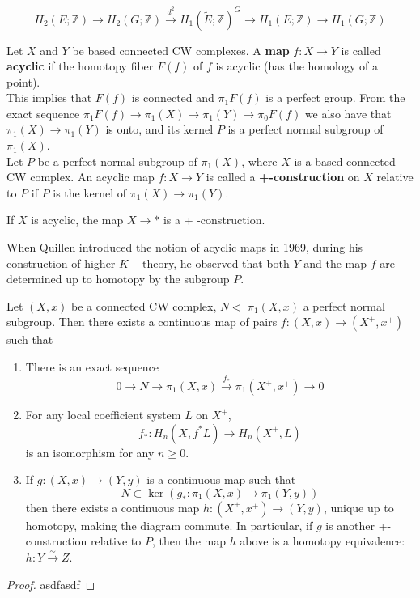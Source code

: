 $$
H_2(E ; \mathbb{Z}) \rightarrow H_2(G ; \mathbb{Z}) \xrightarrow{d^2} H_1(\tilde{E} ; \mathbb{Z})^G \rightarrow H_1(E ; \mathbb{Z}) \rightarrow H_1(G ; \mathbb{Z})
$$



Let $X$ and $Y$ be based connected CW complexes. A \textbf{map} $f: X \rightarrow Y$ is called \textbf{acyclic} if the homotopy fiber $F(f)$ of $f$ is acyclic (has the homology of a point).\\
This implies that $F(f)$ is connected and $\pi_1 F(f)$ is a perfect group.
From the exact sequence $\pi_1 F(f) \rightarrow \pi_1(X) \rightarrow \pi_1(Y) \rightarrow \pi_0 F(f)$ we also have that $\pi_1(X) \rightarrow \pi_1(Y)$ is onto, and its kernel $P$ is a perfect normal subgroup of $\pi_1(X)$.\\

Let $P$ be a perfect normal subgroup of $\pi_1(X)$, where $X$ is a based connected CW complex. An acyclic map $f: X \rightarrow Y$ is called a \textbf{+-construction} on $X$ relative to $P$ if $P$ is the kernel of $\pi_1(X) \rightarrow \pi_1(Y)$.
\begin{lemm}
 If $X$ is acyclic, the map $X \rightarrow *$ is a + -construction.   
\end{lemm}

When Quillen introduced the notion of acyclic maps in 1969, during his construction of higher $K-$theory, he observed that both $Y$ and the map $f$ are determined up to homotopy by the subgroup $P$.

\begin{theo}[Quillen]
Let $(X, x)$ be a connected CW complex, $N \triangleleft$ $\pi_1(X, x)$ a perfect normal subgroup. Then there exists a continuous map of pairs $f:(X, x) \longrightarrow\left(X^{+}, x^{+}\right)$ such that
\begin{enumerate}
    \item There is an exact sequence
    $$
    0 \longrightarrow N \longrightarrow \pi_1(X, x) \xrightarrow{f_*} \pi_1\left(X^{+}, x^{+}\right) \longrightarrow 0
    $$
    \item For any local coefficient system $L$ on $X^{+}$,
    $$
    f_*: H_n\left(X, f^* L\right) \longrightarrow H_n\left(X^{+}, L\right)
    $$
    is an isomorphism for any $n \geq 0$.
    \item If $g:(X, x) \longrightarrow(Y, y)$ is a continuous map such that
    $$
    N \subset \operatorname{ker}\left(g_*: \pi_1(X, x) \longrightarrow \pi_1(Y, y)\right)
    $$
    then there exists a continuous map $h:\left(X^{+}, x^{+}\right) \longrightarrow(Y, y)$, unique up to homotopy, making the diagram commute.
    In particular, if $g$ is another +-construction relative to $P$, then the map $h$ above is a homotopy equivalence: $h: Y \xrightarrow{\sim} Z$.
\end{enumerate}
\end{theo}
\begin{proof}
    asdfasdf
\end{proof}

